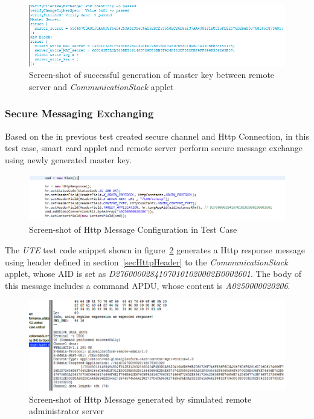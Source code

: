 \begin{figure}[!htb]
	\centering
	\includegraphics[width=1\textwidth]{Images/impl/master-key.png}
		\caption{Screen-shot of successful generation of master key between remote server and \emph{CommunicationStack} applet}
	\label{fig:mk}
\end{figure}


\subsubsection{Secure Messaging Exchanging}



Based on the in previous test created secure channel and Http Connection, in this test case, smart card applet and remote server perform secure message exchange using newly generated master key. 

\begin{figure}[!htb]
	\centering
	\includegraphics[width=1.2\textwidth]{q1.png}
		\caption{Screen-shot of Http Message Configuration in Test Case}
	\label{fig:q1}
\end{figure}

The \emph{UTE} test code snippet shown in figure~\ref{fig:q1} generates a Http response message using header defined in section~\ref{secHttpHeader} to the \emph{CommunicationStack} applet, whose AID is set as \emph{D27600002841070101020002B0002601}. The body of this message includes a command APDU, whose content is \emph{A0250000020206}.


\begin{figure}[!htb]
	\centering
	\includegraphics[width=1\textwidth]{q2.png}
		\caption{Screen-shot of Http Message generated by simulated remote administrator server}
	\label{fig:q2}
\end{figure}

